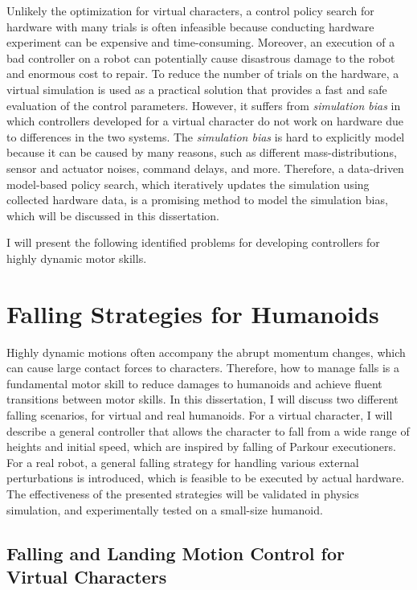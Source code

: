 Unlikely the optimization for virtual characters,
a control policy search for hardware with many trials is often infeasible
because conducting hardware experiment can be expensive and time-consuming.
Moreover, an execution of a bad controller on a robot can potentially cause
disastrous damage to the robot and enormous cost to repair.
To reduce the number of trials on the hardware, a virtual simulation 
is used as a practical solution that provides a fast and safe evaluation
of the control parameters.
However, it suffers from \emph{simulation bias} in which
controllers developed for a virtual character do not work on hardware due
to differences in the two systems.
The \emph{simulation bias} is hard to explicitly model because it can
be caused by many reasons, such as different mass-distributions, sensor 
and actuator noises, command delays, and more.
Therefore, a data-driven model-based policy search, which iteratively 
updates the simulation using collected hardware data, is a promising method 
to model the simulation bias, which will be discussed in this dissertation.

I will present the following identified problems for developing 
controllers for highly dynamic motor skills.

\section{Falling Strategies for Humanoids}
Highly dynamic motions often accompany the abrupt momentum changes, which can
cause large contact forces to characters.
Therefore, how to manage falls is a fundamental motor skill to reduce damages
to humanoids and achieve fluent transitions between motor skills.
In this dissertation, I will discuss two different falling scenarios, 
for  virtual and real humanoids.
For a virtual character, I will describe a general controller that allows the character to fall from a wide range of heights and initial speed,
which are inspired by falling of Parkour executioners.
For a real robot, a general falling strategy for handling various 
external perturbations is introduced, which is feasible to be
executed by actual hardware.
The effectiveness of the presented strategies will be validated in physics
simulation, and experimentally tested on a small-size humanoid.

\subsection{Falling and Landing Motion Control for Virtual Characters}

